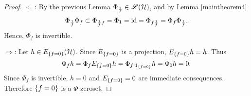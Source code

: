 \begin{proof}
 $\Leftarrow$: 
 By the previous Lemma $\Phi_\frac{1}{f} \in \mathscr{L}(\mathcal{H})$, and by Lemma 
 \ref{maintheorem4}
 \[
 \Phi_\frac{1}{f} \Phi_f \subset \Phi_{\frac{1}{f} f} = \Phi_1 = \operatorname{id} =
 \Phi_{f \frac{1}{f}} = \Phi_f \Phi_\frac{1}{f}.
 \]
Hence, $\Phi_f$ is invertible.

$\Rightarrow$:
Let $h \in E_{\left\lbrace f = 0\right\rbrace}(\mathcal{H})$. Since $E_{\left\lbrace f = 0\right\rbrace}$ is a
projection, $E_{\left\lbrace f = 0\right\rbrace} h = h$. Thus
\[
  \Phi_f h = \Phi_f E_{\left\lbrace f = 0\right\rbrace} h = \Phi_{f \cdot 
    1_{\left\lbrace f = 0\right\rbrace}} h = \Phi_0 h = 0.
\]
Since $\Phi_f $ is invertible, $h =0$ and $E_{\left\lbrace f = 0\right\rbrace} =0$ are
immediate consequences. Therefore $\left\lbrace f = 0\right\rbrace$ is a $\Phi$-zeroset. 

\end{proof}









\newpage






















